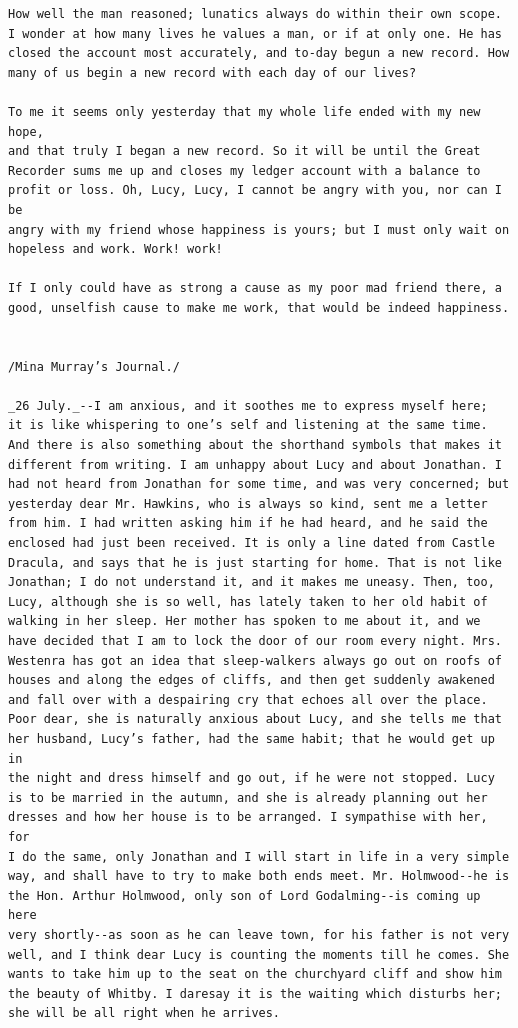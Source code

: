 \documentclass{article}
\begin{document}
\begin{verbatim}
How well the man reasoned; lunatics always do within their own scope.
I wonder at how many lives he values a man, or if at only one. He has
closed the account most accurately, and to-day begun a new record. How
many of us begin a new record with each day of our lives?

To me it seems only yesterday that my whole life ended with my new hope,
and that truly I began a new record. So it will be until the Great
Recorder sums me up and closes my ledger account with a balance to
profit or loss. Oh, Lucy, Lucy, I cannot be angry with you, nor can I be
angry with my friend whose happiness is yours; but I must only wait on
hopeless and work. Work! work!

If I only could have as strong a cause as my poor mad friend there, a
good, unselfish cause to make me work, that would be indeed happiness.


/Mina Murray’s Journal./

_26 July._--I am anxious, and it soothes me to express myself here;
it is like whispering to one’s self and listening at the same time.
And there is also something about the shorthand symbols that makes it
different from writing. I am unhappy about Lucy and about Jonathan. I
had not heard from Jonathan for some time, and was very concerned; but
yesterday dear Mr. Hawkins, who is always so kind, sent me a letter
from him. I had written asking him if he had heard, and he said the
enclosed had just been received. It is only a line dated from Castle
Dracula, and says that he is just starting for home. That is not like
Jonathan; I do not understand it, and it makes me uneasy. Then, too,
Lucy, although she is so well, has lately taken to her old habit of
walking in her sleep. Her mother has spoken to me about it, and we
have decided that I am to lock the door of our room every night. Mrs.
Westenra has got an idea that sleep-walkers always go out on roofs of
houses and along the edges of cliffs, and then get suddenly awakened
and fall over with a despairing cry that echoes all over the place.
Poor dear, she is naturally anxious about Lucy, and she tells me that
her husband, Lucy’s father, had the same habit; that he would get up in
the night and dress himself and go out, if he were not stopped. Lucy
is to be married in the autumn, and she is already planning out her
dresses and how her house is to be arranged. I sympathise with her, for
I do the same, only Jonathan and I will start in life in a very simple
way, and shall have to try to make both ends meet. Mr. Holmwood--he is
the Hon. Arthur Holmwood, only son of Lord Godalming--is coming up here
very shortly--as soon as he can leave town, for his father is not very
well, and I think dear Lucy is counting the moments till he comes. She
wants to take him up to the seat on the churchyard cliff and show him
the beauty of Whitby. I daresay it is the waiting which disturbs her;
she will be all right when he arrives.


\end{verbatim}
\end{document}
